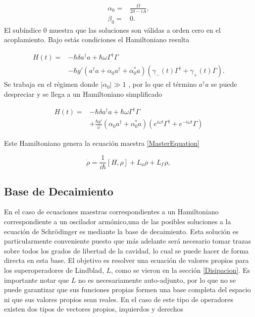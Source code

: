 \documentclass[10pt,a4paper]{report}
\begin{document}
\begin{align}
\alpha_0 =& \frac{\Omega}{2\delta-iA},\\
\beta_0 =& 0.
\end{align} El subíndice 0 muestra que las soluciones son válidas a orden cero en el acoplamiento. Bajo estás condiciones  el Hamiltoniano resulta

\begin{align}
H(t) =& -\hbar \delta a^{\dagger}a +\hbar\omega\Gamma^{\dagger}\Gamma \\
&-\hbar g'(a^{\dagger}a +\alpha_0 a^{\dagger}+\alpha^*_0 a)(\gamma_-(t)\Gamma^{\dagger}+\gamma_+(t)\Gamma)\nonumber.
\end{align}
Se trabaja en el régimen donde $|\alpha_0| \gg 1$
\cite{BarberisLC}, por lo que el término $a^\dagger a$ se puede
despreciar y se llega a un Hamiltoniano simplificado

\begin{align} \label{LCHamiltonian}
H(t) =& -\hbar \delta a^{\dagger}a +\hbar\omega\Gamma^{\dagger}\Gamma \\
&+\frac{\hbar g'}{\omega}(\alpha_0 a^{\dagger}+\alpha^*_0 a)(e^{i\omega t} \nonumber\Gamma^{\dagger}+e^{-i\omega t}\Gamma)
\end{align}

Este Hamiltoniano genera la ecuación maestra \eqref{MasterEquation}

\begin{equation}\label{LCMasterEq}
\dot{\rho} = \frac{1}{i\hbar}[H,\rho] +L_a\rho + L_\Gamma \rho,
\end{equation} 


\subsection{Base de Decaimiento}

En el caso de ecuaciones maestras correspondientes a un Hamiltoniano
correspondiente a un oscilador armónico,una de las posibles soluciones a la ecuación de Schr\"{o}dinger es mediante la base de decaimiento\cite{EnglertDB}. Esta solución es particularmente conveniente puesto que más adelante será necesario tomar trazas sobre todos los grados de libertad de la cavidad, lo cual se puede hacer de forma directa en esta base. El objetivo es resolver una ecuación de valores propios para los superoperadores de Lindblad, $L$, como se vieron en la sección \ref{Disipacion}. Es importante notar que $L$ no es necesariamente auto-adjunto, por lo que no se puede garantizar que sus funciones propias formen una base completa del espacio ni que sus valores propios sean reales. En el caso de este tipo de operadores existen dos tipos de vectores propios\cite{BarnettSD}, izquierdos y derechos
\end{document}
